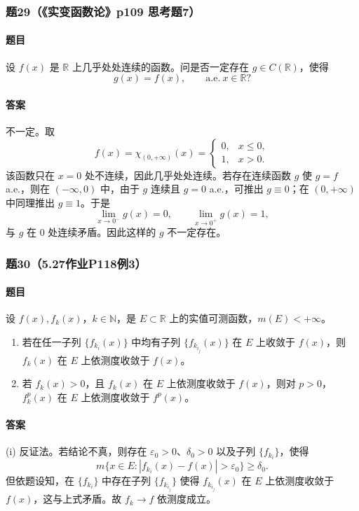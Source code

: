 \documentclass{article}
\newcommand{\R}{\mathbb{R}}
\newcommand{\N}{\mathbb{N}}
\newcommand{\eps}{\varepsilon}
\newcommand{\meas}{m}
\newcommand{\ind}{\chi}
\newcommand{\aee}{\text{a.e.}}
\begin{document}
	\subsubsection*{题29（《实变函数论》p109 思考题7）}
	\paragraph{题目}设 $f(x)$ 是 $\R$ 上几乎处处连续的函数。问是否一定存在 $g\in C(\R)$，使得
	\[
	g(x)=f(x),\qquad \aee\ x\in\R?
	\]
	
	\paragraph{答案}不一定。取
	\[
	f(x)=\ind_{(0,+\infty)}(x)=
	\begin{cases}
		0,&x\le 0,\\
		1,&x>0.
	\end{cases}
	\]
	该函数只在 $x=0$ 处不连续，因此几乎处处连续。若存在连续函数 $g$ 使 $g=f$ a.e.，则在 $(-\infty,0)$ 中，由于 $g$ 连续且 $g=0$ a.e.，可推出 $g\equiv0$；在 $(0,+\infty)$ 中同理推出 $g\equiv1$。于是
	\[
	\lim_{x\to0^-}g(x)=0,
	\qquad
	\lim_{x\to0^+}g(x)=1,
	\]
	与 $g$ 在 $0$ 处连续矛盾。因此这样的 $g$ 不一定存在。
	
	\subsubsection*{题30（5.27作业P118例3）}
	\paragraph{题目}设 $f(x),f_k(x)$，$k\in\N$，是 $E\subset\R$ 上的实值可测函数，$\meas(E)<+\infty$。
	\begin{enumerate}[label=(\roman*)]
		\item 若在任一子列 $\{f_{k_i}(x)\}$ 中均有子列 $\{f_{k_{i_j}}(x)\}$ 在 $E$ 上收敛于 $f(x)$，则 $f_k(x)$ 在 $E$ 上依测度收敛于 $f(x)$。
		\item 若 $f_k(x)>0$，且 $f_k(x)$ 在 $E$ 上依测度收敛于 $f(x)$，则对 $p>0$，$f_k^p(x)$ 在 $E$ 上依测度收敛于 $f^p(x)$。
	\end{enumerate}
	
	
	\paragraph{答案}
	(i) 反证法。若结论不真，则存在 $\eps_0>0$、$\delta_0>0$ 以及子列 $\{f_{k_i}\}$，使得
	\[
	\meas\{x\in E:|f_{k_i}(x)-f(x)|>\eps_0\}\ge\delta_0.
	\]
	但依题设知，在 $\{f_{k_i}\}$ 中存在子列 $\{f_{k_{i_j}}\}$ 使得 $f_{k_{i_j}}(x)$ 在 $E$ 上依测度收敛于 $f(x)$，这与上式矛盾。故 $f_k\to f$ 依测度成立。
	
\end{document}
